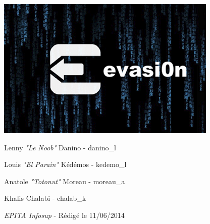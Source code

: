 \documentclass[12pt]{article}
\begin{document}
\thispagestyle{empty}
\begin{center}

\end{center}

\vspace*{0.3cm}

\begin{center}
\end{center}

\vspace*{0.5cm}

\begin{center}
\includegraphics[scale=01.0]{evasion}
\end{center}

\vspace*{0.1cm}

\fontsize{14}{14}
\begin{center}
{Lenny \textcolor{pseudorouge}{\textit{"Le Noob"}} Danino - danino\_l}
\end{center}
\begin{center}
Louis \textcolor{pseudoblue}{\textit{"El Parain"}} Kédémos - kedemo\_l
\end{center}
\begin{center}
Anatole \textcolor{pseudoblue}{\textit{"Totonut"}} Moreau - moreau\_a
\end{center}
\begin{center}
Khalis Chalabi - chalab\_k
\end{center}
\begin{center}
 \textit{EPITA Infosup} - Rédigé le 11/06/2014
\end{center}
\end{document}
